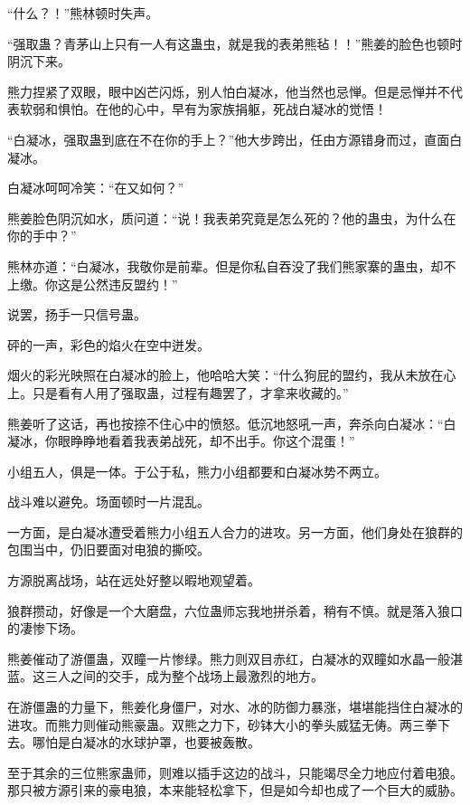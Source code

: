 
\begin{this_body}

“什么？！”熊林顿时失声。

“强取蛊？青茅山上只有一人有这蛊虫，就是我的表弟熊毡！！”熊姜的脸色也顿时阴沉下来。

熊力捏紧了双眼，眼中凶芒闪烁，别人怕白凝冰，他当然也忌惮。但是忌惮并不代表软弱和惧怕。在他的心中，早有为家族捐躯，死战白凝冰的觉悟！

“白凝冰，强取蛊到底在不在你的手上？”他大步跨出，任由方源错身而过，直面白凝冰。

白凝冰呵呵冷笑：“在又如何？”

熊姜脸色阴沉如水，质问道：“说！我表弟究竟是怎么死的？他的蛊虫，为什么在你的手中？”

熊林亦道：“白凝冰，我敬你是前辈。但是你私自吞没了我们熊家寨的蛊虫，却不上缴。你这是公然违反盟约！”

说罢，扬手一只信号蛊。

砰的一声，彩色的焰火在空中迸发。

烟火的彩光映照在白凝冰的脸上，他哈哈大笑：“什么狗屁的盟约，我从未放在心上。只是看有人用了强取蛊，过程有趣罢了，才拿来收藏的。”

熊姜听了这话，再也按捺不住心中的愤怒。低沉地怒吼一声，奔杀向白凝冰：“白凝冰，你眼睁睁地看着我表弟战死，却不出手。你这个混蛋！”

小组五人，俱是一体。于公于私，熊力小组都要和白凝冰势不两立。

战斗难以避免。场面顿时一片混乱。

一方面，是白凝冰遭受着熊力小组五人合力的进攻。另一方面，他们身处在狼群的包围当中，仍旧要面对电狼的撕咬。

方源脱离战场，站在远处好整以暇地观望着。

狼群攒动，好像是一个大磨盘，六位蛊师忘我地拼杀着，稍有不慎。就是落入狼口的凄惨下场。

熊姜催动了游僵蛊，双瞳一片惨绿。熊力则双目赤红，白凝冰的双瞳如水晶一般湛蓝。这三人之间的交手，成为整个战场上最激烈的地方。

在游僵蛊的力量下，熊姜化身僵尸，对水、冰的防御力暴涨，堪堪能挡住白凝冰的进攻。而熊力则催动熊豪蛊。双熊之力下，砂钵大小的拳头威猛无俦。两三拳下去。哪怕是白凝冰的水球护罩，也要被轰散。

至于其余的三位熊家蛊师，则难以插手这边的战斗，只能竭尽全力地应付着电狼。那只被方源引来的豪电狼，本来能轻松拿下，但是如今却也成了一个巨大的威胁。


\end{this_body}
